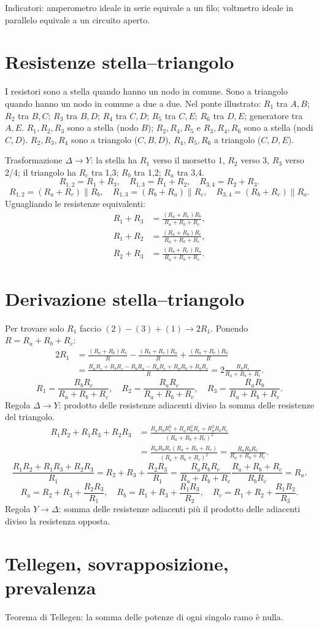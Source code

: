 \documentclass[11pt,a4paper]{article}
\newcommand{\pagina}[2]{\clearpage\section*{#2}}
\begin{document}
Indicatori: amperometro ideale in serie equivale a un filo; voltmetro ideale in parallelo equivale a un circuito aperto.
\pagina{9}{Resistenze stella--triangolo}
I resistori sono a stella quando hanno un nodo in comune. Sono a triangolo quando hanno un nodo in comune a due a due. Nel ponte illustrato: $R_1$ tra $A,B$; $R_2$ tra $B,C$; $R_3$ tra $B,D$; $R_4$ tra $C,D$; $R_5$ tra $C,E$; $R_6$ tra $D,E$; generatore tra $A,E$. $R_1,R_2,R_3$ sono a stella (nodo $B$); $R_2,R_4,R_5$ e $R_3,R_4,R_6$ sono a stella (nodi $C,D$). $R_2,R_3,R_4$ sono a triangolo ($C,B,D$), $R_4,R_5,R_6$ a triangolo ($C,D,E$).

Trasformazione $\Delta\to Y$: la stella ha $R_1$ verso il morsetto 1, $R_2$ verso 3, $R_3$ verso 2/4; il triangolo ha $R_c$ tra 1,3; $R_b$ tra 1,2; $R_a$ tra 3,4.
\[R_{1,2}=R_1+R_3,\quad R_{1,3}=R_1+R_2,\quad R_{3,4}=R_2+R_3.\]
\[R_{1,2}=(R_a+R_c)\parallel R_b,\quad R_{1,3}=(R_b+R_a)\parallel R_c,\quad R_{3,4}=(R_b+R_c)\parallel R_a.\]
Uguagliando le resistenze equivalenti:
\begin{align}R_1+R_3&=\frac{(R_a+R_c)R_b}{R_a+R_b+R_c},\tag{1}\\R_1+R_2&=\frac{(R_a+R_b)R_c}{R_a+R_b+R_c},\tag{2}\\R_2+R_3&=\frac{(R_b+R_c)R_a}{R_a+R_b+R_c}.\tag{3}\end{align}
\pagina{10}{Derivazione stella--triangolo}
Per trovare solo $R_1$ faccio $(2)-(3)+(1)\to2R_1$. Ponendo $R=R_a+R_b+R_c$:
\begin{align*}2R_1&=\frac{(R_a+R_b)R_c}{R}-\frac{(R_b+R_c)R_a}{R}+\frac{(R_a+R_c)R_b}{R}\\&=\frac{R_aR_c+R_bR_c-R_bR_a-R_aR_c+R_aR_b+R_bR_c}{R}=2\frac{R_bR_c}{R_a+R_b+R_c}.\end{align*}
\[R_1=\frac{R_bR_c}{R_a+R_b+R_c},\quad R_2=\frac{R_aR_c}{R_a+R_b+R_c},\quad R_3=\frac{R_aR_b}{R_a+R_b+R_c}.\]
Regola $\Delta\to Y$: prodotto delle resistenze adiacenti diviso la somma delle resistenze del triangolo.
\begin{align*}R_1R_2+R_1R_3+R_2R_3&=\frac{R_aR_bR_c^2+R_aR_b^2R_c+R_a^2R_bR_c}{(R_a+R_b+R_c)^2}\\&=\frac{R_aR_bR_c(R_a+R_b+R_c)}{(R_a+R_b+R_c)^2}=\frac{R_aR_bR_c}{R_a+R_b+R_c}.\tag{4}\end{align*}
\[\frac{R_1R_2+R_1R_3+R_2R_3}{R_1}=R_2+R_3+\frac{R_2R_3}{R_1}=\frac{R_aR_bR_c}{R_a+R_b+R_c}\frac{R_a+R_b+R_c}{R_bR_c}=R_a.\]
\[R_a=R_2+R_3+\frac{R_2R_3}{R_1},\quad R_b=R_1+R_3+\frac{R_1R_3}{R_2},\quad R_c=R_1+R_2+\frac{R_1R_2}{R_3}.\]
Regola $Y\to\Delta$: somma delle resistenze adiacenti più il prodotto delle adiacenti diviso la resistenza opposta.
\pagina{11}{Tellegen, sovrapposizione, prevalenza}
Teorema di Tellegen: la somma delle potenze di ogni singolo ramo è nulla.
\end{document}
